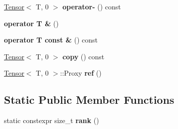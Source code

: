 \begin{DoxyCompactItemize}
\item 
\hyperlink{classtensor_1_1Tensor}{Tensor}$<$ T, 0 $>$ {\bfseries operator-\/} () const \hypertarget{classtensor_1_1Tensor_3_01T_00_010_01_4_a66d6b65db1878d8034e178963f458aaf}{}\label{classtensor_1_1Tensor_3_01T_00_010_01_4_a66d6b65db1878d8034e178963f458aaf}

\item 
{\bfseries operator T \&} ()\hypertarget{classtensor_1_1Tensor_3_01T_00_010_01_4_acf21c42d03c364374523a2199758e6b2}{}\label{classtensor_1_1Tensor_3_01T_00_010_01_4_acf21c42d03c364374523a2199758e6b2}

\item 
{\bfseries operator T const \&} () const \hypertarget{classtensor_1_1Tensor_3_01T_00_010_01_4_abf44056cff1199acdd10e1338699ebd7}{}\label{classtensor_1_1Tensor_3_01T_00_010_01_4_abf44056cff1199acdd10e1338699ebd7}

\item 
\hyperlink{classtensor_1_1Tensor}{Tensor}$<$ T, 0 $>$ {\bfseries copy} () const \hypertarget{classtensor_1_1Tensor_3_01T_00_010_01_4_adfbd014c04bdfd5cad14db30bf4a6742}{}\label{classtensor_1_1Tensor_3_01T_00_010_01_4_adfbd014c04bdfd5cad14db30bf4a6742}

\item 
\hyperlink{classtensor_1_1Tensor}{Tensor}$<$ T, 0 $>$\+::Proxy {\bfseries ref} ()\hypertarget{classtensor_1_1Tensor_3_01T_00_010_01_4_aa589381f65175542e75c84d1bf5be6dd}{}\label{classtensor_1_1Tensor_3_01T_00_010_01_4_aa589381f65175542e75c84d1bf5be6dd}

\end{DoxyCompactItemize}
\subsection*{Static Public Member Functions}
\begin{DoxyCompactItemize}
\item 
static constexpr size\+\_\+t {\bfseries rank} ()\hypertarget{classtensor_1_1Tensor_3_01T_00_010_01_4_a29f5b2dcb66a5a1b390b9df216ebf418}{}\label{classtensor_1_1Tensor_3_01T_00_010_01_4_a29f5b2dcb66a5a1b390b9df216ebf418}

\end{DoxyCompactItemize}
